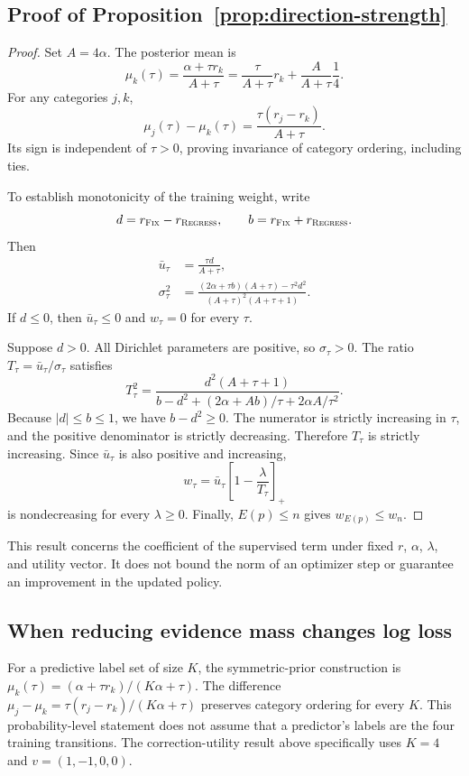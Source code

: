 \documentclass{article}
\newcommand{\fix}{\textsc{Fix}\xspace}
\newcommand{\regress}{\textsc{Regress}\xspace}
\begin{document}
\subsection{Proof of Proposition~\ref{prop:direction-strength}}

\begin{proof}
Set $A=4\alpha$. The posterior mean is
\[
\mu_k(\tau)=\frac{\alpha+\tau r_k}{A+\tau}
=\frac{\tau}{A+\tau}r_k+\frac{A}{A+\tau}\frac14.
\]
For any categories $j,k$,
\[
\mu_j(\tau)-\mu_k(\tau)
=\frac{\tau(r_j-r_k)}{A+\tau}.
\]
Its sign is independent of $\tau>0$, proving invariance of category ordering, including ties.

To establish monotonicity of the training weight, write
\[
d=r_{\fix}-r_{\regress},
\qquad
b=r_{\fix}+r_{\regress}.
\]
Then
\begin{align}
\bar u_\tau&=\frac{\tau d}{A+\tau},\\
\sigma_\tau^2
&=\frac{(2\alpha+\tau b)(A+\tau)-\tau^2d^2}
{(A+\tau)^2(A+\tau+1)}.
\end{align}
If $d\le0$, then $\bar u_\tau\le0$ and $w_\tau=0$ for every $\tau$.

Suppose $d>0$. All Dirichlet parameters are positive, so $\sigma_\tau>0$. The ratio $T_\tau=\bar u_\tau/\sigma_\tau$ satisfies
\begin{equation}
T_\tau^2
=\frac{d^2(A+\tau+1)}
{b-d^2+(2\alpha+Ab)/\tau+2\alpha A/\tau^2}.
\label{eq:utility-snr}
\end{equation}
Because $|d|\le b\le1$, we have $b-d^2\ge0$. The numerator is strictly increasing in $\tau$, and the positive denominator is strictly decreasing. Therefore $T_\tau$ is strictly increasing. Since $\bar u_\tau$ is also positive and increasing,
\[
w_\tau
=\bar u_\tau\left[1-\frac{\lambda}{T_\tau}\right]_+
\]
is nondecreasing for every $\lambda\ge0$. Finally, $E(p)\le n$ gives $w_{E(p)}\le w_n$.
\end{proof}

This result concerns the coefficient of the supervised term under fixed $r$, $\alpha$, $\lambda$, and utility vector. It does not bound the norm of an optimizer step or guarantee an improvement in the updated policy.

\subsection{When reducing evidence mass changes log loss}
\label{app:logloss}

For a predictive label set of size $K$, the symmetric-prior construction is
$\mu_k(\tau)=(\alpha+\tau r_k)/(K\alpha+\tau)$.
The difference $\mu_j-\mu_k=\tau(r_j-r_k)/(K\alpha+\tau)$ preserves
category ordering for every $K$. This probability-level statement does
not assume that a predictor's labels are the four training transitions.
The correction-utility result above specifically uses $K=4$ and
$v=(1,-1,0,0)$.
\end{document}
